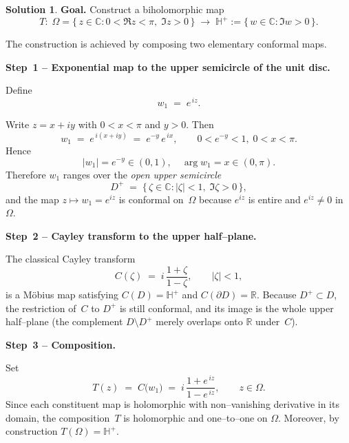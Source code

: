 \documentclass[12pt]{article}
\theoremstyle{definition} %
\newtheorem{solution}{Solution}
\theoremstyle{plain} %
\begin{document}
        \begin{solution}
          \textbf{Goal.}  Construct a biholomorphic map
          \[
             T:\;
             \Omega=\{\,z\in\mathbb{C}:0<\Re z<\pi,\;\Im z>0\,\}
             \;\longrightarrow\;
             \mathbb{H}^{+}:=\{\,w\in\mathbb{C}:\Im w>0\,\}.
          \]
          
          The construction is achieved by composing two elementary conformal maps.
          
          \bigskip
          \textbf{Step 1 – Exponential map to the upper semicircle of the unit disc.}
          
          Define
          \[
             w_1 \;=\; e^{\,i z}.
          \]
          
          Write $z=x+iy$ with $0<x<\pi$ and $y>0$.  Then
          \[
             w_1 \;=\; e^{\,i(x+iy)}
                  \;=\; e^{-y}\,e^{\,ix},
             \qquad
             0<e^{-y}<1,\; 0<x<\pi.
          \]
          Hence
          \[
             |w_1| = e^{-y} \in (0,1), 
             \quad
             \arg w_1 = x \in (0,\pi).
          \]
          Therefore $w_1$ ranges over the \emph{open upper semicircle}
          \[
             D^{+} \;=\;\{\,\zeta\in\mathbb{C}:|\zeta|<1,\;\Im\zeta>0\,\},
          \]
          and the map $z\mapsto w_1=e^{iz}$ is conformal on~$\Omega$ because
          $e^{iz}$ is entire and $e^{iz}\neq0$ in~$\Omega$.
          
          \bigskip
          \textbf{Step 2 – Cayley transform to the upper half–plane.}
          
          The classical Cayley transform
          \[
             C(\zeta) \;=\;
             i\,\frac{1+\zeta}{1-\zeta},
             \qquad |\zeta|<1,
          \]
          is a Möbius map satisfying $C(D)=\mathbb{H}^{+}$ and
          $C(\partial D)=\mathbb{R}$.  Because $D^{+}\subset D$, the restriction
          of~$C$ to $D^{+}$ is still conformal, and its image is the whole upper
          half–plane (the complement $D\setminus D^{+}$ merely overlaps onto
          $\mathbb{R}$ under~$C$).
          
          \bigskip
          \textbf{Step 3 – Composition.}
          
          Set
          \[
             T(z) \;=\;
             C\!\bigl(w_1\bigr)
             \;=\;
             i\,
             \frac{1+e^{\,i z}}{1-e^{\,i z}},
             \qquad z\in\Omega.
          \]
          Since each constituent map is holomorphic with non–vanishing derivative
          in its domain, the composition~$T$ is holomorphic and one–to–one on
          $\Omega$.  Moreover, by construction $T(\Omega)=\mathbb{H}^{+}$.
          

\end{solution}
\end{document}
